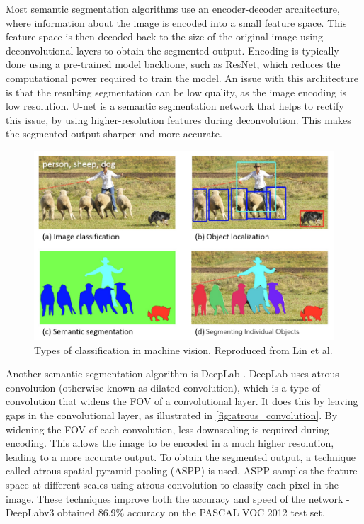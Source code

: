 Most semantic segmentation algorithms use an encoder-decoder architecture, where information about the image is encoded into a small feature space.
This feature space is then decoded back to the size of the original image using deconvolutional layers to obtain the segmented output.
Encoding is typically done using a pre-trained model backbone, such as ResNet, which reduces the computational power required to train
the model.
An issue with this architecture is that the resulting segmentation can be low quality, as the image encoding is low resolution.
U-net \cite{ronnebergerUNetConvolutionalNetworks2015} is a semantic segmentation network that helps to rectify this issue,
by using higher-resolution features during deconvolution.
This makes the segmented output sharper and more accurate.

\begin{figure}[H]
    \centering
    \includegraphics[width=0.6\linewidth]{images/classification_types.png}
    \caption{Types of classification in machine vision. Reproduced from Lin et al. \cite{linMicrosoftCOCOCommon2014}}
    \label{fig:classification_types}
\end{figure}

Another semantic segmentation algorithm is DeepLab \cite{chenSemanticImageSegmentation2014}\cite{chenDeepLabSemanticImage2016}\cite{chenRethinkingAtrousConvolution2017}.
DeepLab uses atrous convolution (otherwise known as dilated convolution), which is a type of convolution that widens the FOV of a convolutional layer.
It does this by leaving gaps in the convolutional layer, as illustrated in \cref{fig:atrous_convolution}.
By widening the FOV of each convolution, less downscaling is required during encoding. This allows the image to be encoded in a much higher resolution,
leading to a more accurate output.
To obtain the segmented output, a technique called atrous spatial pyramid pooling (ASPP) is used. ASPP samples the feature space at different
scales using atrous convolution to classify each pixel in the image.
These techniques improve both the accuracy and speed of the network - DeepLabv3 obtained 86.9\% accuracy on the PASCAL VOC 2012 test set.


